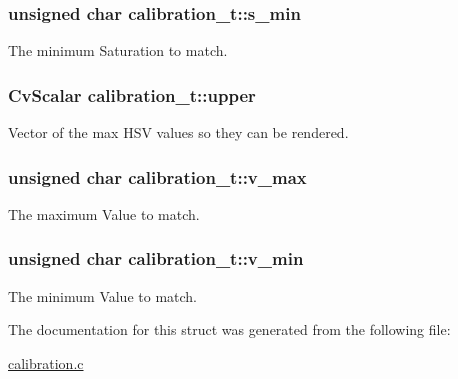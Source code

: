 \subsubsection[{\texorpdfstring{s\+\_\+min}{s_min}}]{\setlength{\rightskip}{0pt plus 5cm}unsigned char calibration\+\_\+t\+::s\+\_\+min}\hypertarget{structcalibration__t_a408c4087fc2037c302179889a77c46da}{}\label{structcalibration__t_a408c4087fc2037c302179889a77c46da}
The minimum Saturation to match. 
\subsubsection[{\texorpdfstring{upper}{upper}}]{\setlength{\rightskip}{0pt plus 5cm}Cv\+Scalar calibration\+\_\+t\+::upper}\hypertarget{structcalibration__t_ab577a4447f9cfff14e7cb336c18fcc96}{}\label{structcalibration__t_ab577a4447f9cfff14e7cb336c18fcc96}
Vector of the max H\+SV values so they can be rendered. 
\subsubsection[{\texorpdfstring{v\+\_\+max}{v_max}}]{\setlength{\rightskip}{0pt plus 5cm}unsigned char calibration\+\_\+t\+::v\+\_\+max}\hypertarget{structcalibration__t_accaf5519bae1849954995bcdf673f1cd}{}\label{structcalibration__t_accaf5519bae1849954995bcdf673f1cd}
The maximum Value to match. 
\subsubsection[{\texorpdfstring{v\+\_\+min}{v_min}}]{\setlength{\rightskip}{0pt plus 5cm}unsigned char calibration\+\_\+t\+::v\+\_\+min}\hypertarget{structcalibration__t_a05d985e74be2e4415fe9239137672741}{}\label{structcalibration__t_a05d985e74be2e4415fe9239137672741}
The minimum Value to match. 

The documentation for this struct was generated from the following file\+:\begin{DoxyCompactItemize}
\item 
\hyperlink{calibration_8c}{calibration.\+c}\end{DoxyCompactItemize}
